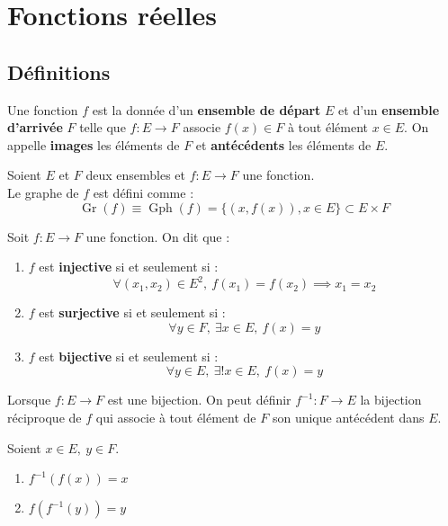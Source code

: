 \chapter{Fonctions réelles}
\def\arraystretch{1}

\section{Définitions}
\begin{definition}[Fonction]
	Une fonction $f$ est la donnée d'un \textbf{ensemble de départ} $E$ et d'un \textbf{ensemble d'arrivée} $F$ telle que 
	$ f : E \to F $
	associe $f(x) \in F$ à tout élément $x \in E$.
	On appelle \textbf{images} les éléments de $F$ et \textbf{antécédents} les éléments de $E$.
\end{definition}

\begin{definition}
	Soient $E$ et $F$ deux ensembles et $f : E \to F$ une fonction.
	\\
	Le graphe de $f$ est défini comme :
	\[ \operatorname{Gr}(f) \equiv \operatorname{Gph}(f) = \{ (x, f(x)), x \in E \} \subset E \times F \] 
\end{definition}

\begin{definition}
	Soit $f : E \to F$ une fonction. On dit que :
    \begin{enumerate}
        \item $f$ est \textbf{injective} si et seulement si : 
        \[ \forall (x_1, x_2) \in E^2,\ f(x_1) = f(x_2) \implies x_1 = x_2 \]
        \item $f$ est \textbf{surjective} si et seulement si : 
        \[ \forall y \in F,\ \exists x \in E,\ f(x) = y \]
        \item $f$ est \textbf{bijective} si et seulement si :
        \[ \forall y \in E,\ \exists ! x \in E,\ f(x) = y \]
    \end{enumerate}
\end{definition}

\begin{definition}
	Lorsque $f : E \to F$ est une bijection. On peut définir $f^{-1} : F \to E$ la bijection réciproque de $f$ qui associe à tout élément de $F$ son unique antécédent dans $E$.
\end{definition}

\begin{proposition}
	Soient $x \in E,\ y \in F$.
    \begin{multicols}{2}
        \begin{enumerate}
            \item $f^{-1} (f(x)) = x$
            \item $f(f^{-1}(y)) = y$
        \end{enumerate}
    \end{multicols}
\end{proposition}

